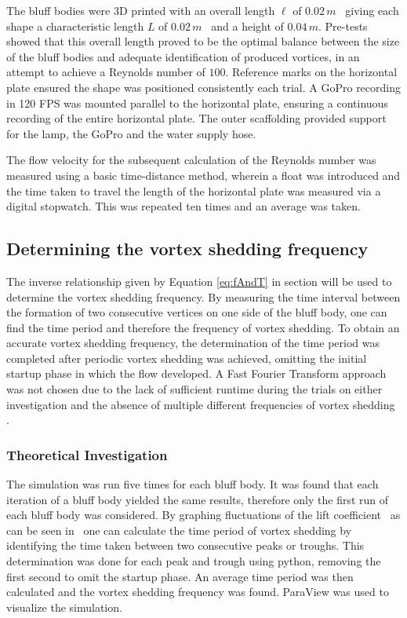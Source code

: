The bluff bodies were 3D printed with an overall length $\ell$ of $0.02\,m$ \textemdash\ giving each shape a characteristic length $L$ of $0.02\,m$ \textemdash\ and a height of $0.04\,m$. Pre-tests showed that this overall length proved to be the optimal balance between the size of the bluff bodies and adequate identification of produced vortices, in an attempt to achieve a Reynolds number of $100$. Reference marks on the horizontal plate ensured the shape was positioned consistently each trial. A GoPro recording in 120 FPS was mounted parallel to the horizontal plate, ensuring a continuous recording of the entire horizontal plate. The outer scaffolding provided support for the lamp, the GoPro and the water supply hose. 

The flow velocity for the subsequent calculation of the Reynolds number was measured using a basic time-distance method, wherein a float was introduced and the time taken to travel the length of the horizontal plate was measured via a digital stopwatch. This was repeated ten times and an average was taken.

\subsection{Determining the vortex shedding frequency}
The inverse relationship given by Equation \eqref{eq:fAndT} in section  will be used to determine the vortex shedding frequency. By measuring the time interval between the formation of two consecutive vertices on one side of the bluff body, one can find the time period and therefore the frequency of vortex shedding. To obtain an accurate vortex shedding frequency, the determination of the time period was completed after periodic vortex shedding was achieved, omitting the initial startup phase in which the flow developed. A Fast Fourier Transform approach was not chosen due to the lack of sufficient runtime during the trials on either investigation and the absence of multiple different frequencies of vortex shedding \parencites[10--11]{shi2025vortex}[12]{xu_experimental_2025}.

\subsubsection{Theoretical Investigation}
\label{sec:theoreticalMethod}
The simulation was run five times for each bluff body. It was found that each iteration of a bluff body yielded the same results, therefore only the first run of each bluff body was considered. By graphing fluctuations of the lift coefficient \textemdash\ as can be seen in  \textemdash\ one can calculate the time period of vortex shedding by identifying the time taken between two consecutive peaks or troughs. This determination was done for each peak and trough using python, removing the first second to omit the startup phase. An average time period was then calculated and the vortex shedding frequency was found. ParaView was used to visualize the simulation.

